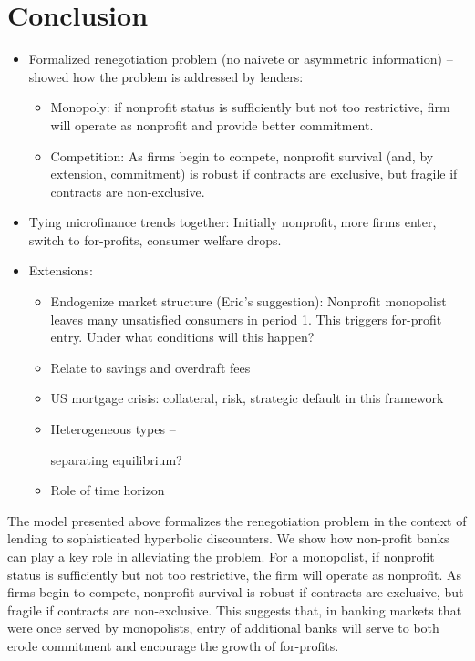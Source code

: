 \documentclass[11pt]{article}%
\begin{document}
\section{Conclusion}

\begin{itemize}
\item Formalized renegotiation problem (no naivete or asymmetric information)
-- showed how the problem is addressed by lenders:

\begin{itemize}
\item Monopoly: if nonprofit status is sufficiently but not too restrictive,
firm will operate as nonprofit and provide better commitment.

\item Competition: As firms begin to compete, nonprofit survival (and, by
extension, commitment) is robust if contracts are exclusive, but fragile if
contracts are non-exclusive.
\end{itemize}

\item Tying microfinance trends together: Initially nonprofit, more firms
enter, switch to for-profits, consumer welfare drops.

\item Extensions:

\begin{itemize}
\item Endogenize market structure (Eric's suggestion): Nonprofit monopolist
leaves many unsatisfied consumers in period 1. This triggers for-profit entry.
Under what conditions will this happen?

\item Relate to savings and overdraft fees

\item US mortgage crisis: collateral, risk, strategic default in this framework

\item Heterogeneous types --%

separating equilibrium?

\item Role of time horizon
\end{itemize}
\end{itemize}

\bigskip

The model presented above formalizes the renegotiation problem in the context
of lending to sophisticated hyperbolic discounters. We show how non-profit
banks can play a key role in alleviating the problem. For a monopolist, if
nonprofit status is sufficiently but not too restrictive, the firm will
operate as nonprofit. As firms begin to compete, nonprofit survival is robust
if contracts are exclusive, but fragile if contracts are non-exclusive. This
suggests that, in banking markets that were once served by monopolists, entry
of additional banks will serve to both erode commitment and encourage the
growth of for-profits.
\end{document}

